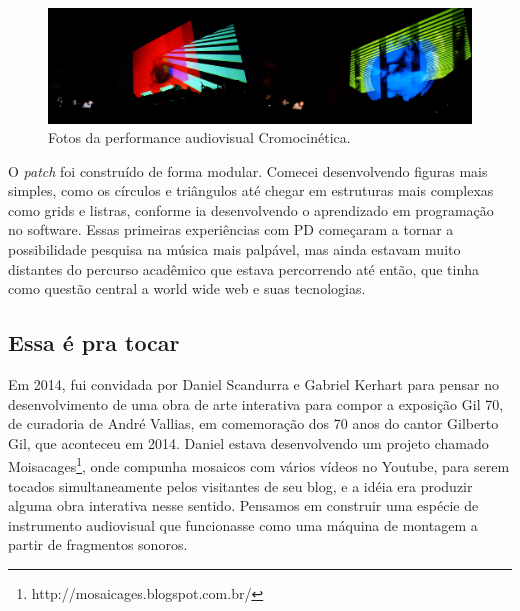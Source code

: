 \begin{figure}

\includegraphics[width=1\textwidth]{pictures/cap1/cromocinetica}
\caption{Fotos da performance audiovisual Cromocinética.}
\label{fig:cromocinetica}
\end{figure}

O \emph{patch} foi construído de forma modular. Comecei desenvolvendo figuras mais simples, como os círculos e triângulos até chegar em estruturas mais complexas como grids e listras, conforme ia desenvolvendo o aprendizado em programação no software. Essas primeiras experiências com PD começaram a tornar a possibilidade pesquisa na música mais palpável, mas ainda estavam muito distantes do percurso acadêmico que estava percorrendo até então, que tinha como questão central a world wide web e suas tecnologias.

\subsection{Essa é pra tocar}
Em 2014, fui convidada por Daniel Scandurra e Gabriel Kerhart para pensar no desenvolvimento de uma obra de arte interativa para compor a exposição Gil 70, de curadoria de André Vallias, em comemoração dos 70 anos do cantor Gilberto Gil, que aconteceu em 2014. Daniel estava desenvolvendo um projeto chamado Moisacages\footnote{http://mosaicages.blogspot.com.br/}, onde compunha mosaicos com vários vídeos no Youtube, para serem tocados simultaneamente pelos visitantes de seu blog, e a idéia era produzir alguma obra interativa nesse sentido. Pensamos em construir uma espécie de instrumento audiovisual que funcionasse como uma máquina de montagem a partir de fragmentos sonoros.

